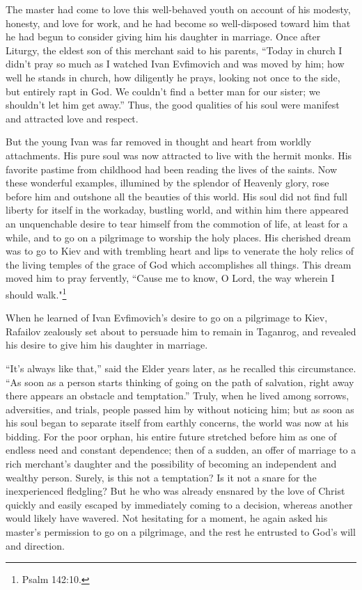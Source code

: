 The master had come to love this well-behaved youth on account of his modesty, honesty, and love for work, and he had become so well-disposed toward him that he had begun to consider giving him his daughter in marriage. Once after Liturgy, the eldest son of this merchant said to his parents, “Today in church I didn't pray so much as I watched Ivan Evfimovich and was moved by him; how well he stands in church, how diligently he prays, looking not once to the side, but entirely rapt in God. We couldn't find a better man for our sister; we shouldn't let him get away.” Thus, the good qualities of his soul were manifest and attracted love and respect.

But the young Ivan was far removed in thought and heart from worldly attachments. His pure soul was now attracted to live with the hermit monks. His favorite pastime from childhood had been reading the lives of the saints. Now these wonderful examples, illumined by the splendor of Heavenly glory, rose before him and outshone all the beauties of this world. His soul did not find full liberty for itself in the workaday, bustling world, and within him there appeared an unquenchable desire to tear himself from the commotion of life, at least for a while, and to go on a pilgrimage to worship the holy places. His cherished dream was to go to Kiev and with trembling heart and lips to venerate the holy relics of the living temples of the grace of God which accomplishes all things. This dream moved him to pray fervently, “Cause me to know, O Lord, the way wherein I should walk."\footnote{Psalm 142:10.}

When he learned of Ivan Evfimovich's desire to go on a pilgrimage to Kiev, Rafailov zealously set about to persuade him to remain in Taganrog, and revealed his desire to give him his daughter in marriage.

“It's always like that,” said the Elder years later, as he recalled this circumstance. “As soon as a person starts thinking of going on the path of salvation, right away there appears an obstacle and temptation.” Truly, when he lived among sorrows, adversities, and trials, people passed him by without noticing him; but as soon as his soul began to separate itself from earthly concerns, the world was now at his bidding. For the poor orphan, his entire future stretched before him as one of endless need and constant dependence; then of a sudden, an offer of marriage to a rich merchant's daughter and the possibility of becoming an independent and wealthy person. Surely, is this not a temptation? Is it not a snare for the inexperienced fledgling? But he who was already ensnared by the love of Christ quickly and easily escaped by immediately coming to a decision, whereas another would likely have wavered. Not hesitating for a moment, he again asked his master's permission to go on a pilgrimage, and the rest he entrusted to God's will and direction.

